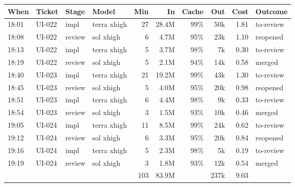\documentclass[11pt,a4paper]{article}
\begin{document}
{\small
\begin{tabularx}{\linewidth}{@{}llllrrrrrX@{}}
\toprule
When & Ticket & Stage & Model & Min & In & Cache & Out & Cost & Outcome \\
\midrule
18:01 & UI-022 & impl & terra xhigh & 27 & 28.4M & 99\% & 50k & 1.81 & to-review \\
18:08 & UI-022 & review & sol xhigh & 6 & 4.7M & 95\% & 23k & 1.10 & reopened \\
18:13 & UI-022 & impl & terra xhigh & 5 & 3.7M & 98\% & 7k & 0.30 & to-review \\
18:19 & UI-022 & review & sol xhigh & 5 & 2.1M & 94\% & 14k & 0.58 & merged \\
18:40 & UI-023 & impl & terra xhigh & 21 & 19.2M & 99\% & 43k & 1.30 & to-review \\
18:45 & UI-023 & review & sol xhigh & 5 & 4.0M & 95\% & 20k & 0.98 & reopened \\
18:51 & UI-023 & impl & terra xhigh & 6 & 4.4M & 98\% & 9k & 0.33 & to-review \\
18:54 & UI-023 & review & sol xhigh & 3 & 1.5M & 93\% & 10k & 0.46 & merged \\
19:05 & UI-024 & impl & terra xhigh & 11 & 8.5M & 99\% & 24k & 0.62 & to-review \\
19:12 & UI-024 & review & sol xhigh & 6 & 3.3M & 95\% & 20k & 0.84 & reopened \\
19:16 & UI-024 & impl & terra xhigh & 5 & 2.3M & 98\% & 5k & 0.19 & to-review \\
19:19 & UI-024 & review & sol xhigh & 3 & 1.8M & 93\% & 12k & 0.54 & merged \\
\midrule
 & & & & 103 & 83.9M & & 237k & 9.03 & \\
\bottomrule
\end{tabularx}
}

\begin{center}
\end{center}
\end{document}
